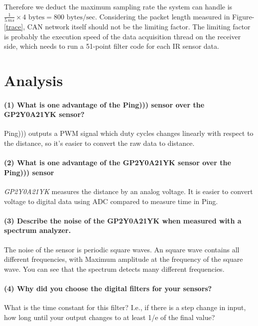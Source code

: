 \documentclass[a4paper]{article}
\begin{document}
Therefore we deduct the maximum sampling rate the system can handle is $\frac{1}{5 \, ms} \times 4 \text{ bytes} = 800
 \text{ bytes/sec} $.
Considering the packet length measured in Figure-\ref{trace}, CAN network itself should not be the limiting factor.
The limiting factor is probably the execution speed of the data acquisition thread on the receiver side, which
needs to run a 51-point filter code for each IR sensor data.

\section{Analysis}

\paragraph{(1) What is one advantage of the Ping))) sensor over the GP2Y0A21YK sensor? \\ }

Ping))) outputs a PWM signal which duty cycles changes linearly with respect to the distance, so it's easier to convert the raw data to distance.

\paragraph{(2) What is one advantage of the \textbf{GP2Y0A21YK} sensor over the Ping))) sensor \\ }

\emph{GP2Y0A21YK} measures the distance by an analog voltage. It is easier to convert voltage to digital data using ADC compared to measure time in Ping.

\paragraph{(3) Describe the noise of the \textbf{GP2Y0A21YK} when measured with a spectrum analyzer. \\ }

The noise of the sensor is periodic square waves. An square wave contains all different frequencies, with Maximum amplitude at the frequency of the square wave.
You can see that the spectrum detects many different frequencies.

\paragraph{(4) Why did you choose the digital filters for your sensors? \\ }
What is the time constant for this filter? I.e., if there is a step change in input, how long until your output changes to at least 1/e of the final value?
\end{document}
